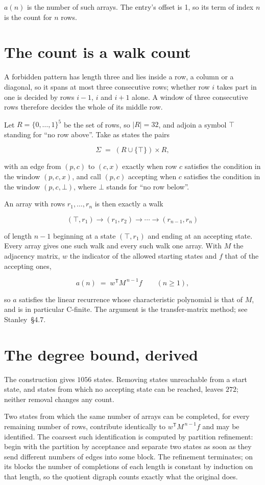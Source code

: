 \documentclass[11pt]{article}
\theoremstyle{definition}
\begin{document}
$a(n)$ is the number of such arrays. The entry's offset is 1, so its term of index $n$ is the count for $n$ rows.

\section{The count is a walk count}

A forbidden pattern has length three and lies inside a row, a column or a diagonal, so it spans at most three consecutive rows; whether row $i$ takes part in one is decided by rows $i-1$, $i$ and $i+1$ alone. A window of three consecutive rows therefore decides the whole of its middle row.

Let $R = \{0,\dots,1\}^{5}$ be the set of rows, so $|R| = 32$, and adjoin a symbol $\top$ standing for ``no row above''. Take as states the pairs

\[\Sigma \;=\; (R \cup \{\top\}) \times R,\]

with an edge from $(p,c)$ to $(c,x)$ exactly when row $c$ satisfies the condition in the window $(p,c,x)$, and call $(p,c)$ accepting when $c$ satisfies the condition in the window $(p,c,\bot)$, where $\bot$ stands for ``no row below''.

An array with rows $r_1,\dots,r_n$ is then exactly a walk

\[(\top,r_1) \to (r_1,r_2) \to \cdots \to (r_{n-1},r_n)\]

of length $n-1$ beginning at a state $(\top,r_1)$ and ending at an accepting state. Every array gives one such walk and every such walk one array. With $M$ the adjacency matrix, $w$ the indicator of the allowed starting states and $f$ that of the accepting ones,

\[a(n) \;=\; w^{\mathsf T} M^{\,n-1} f \qquad (n \ge 1),\]

so $a$ satisfies the linear recurrence whose characteristic polynomial is that of $M$, and is in particular C-finite. The argument is the transfer-matrix method; see Stanley~\S4.7.

\section{The degree bound, derived}

The construction gives $1056$ states. Removing states unreachable from a start state, and states from which no accepting state can be reached, leaves $272$; neither removal changes any count.

Two states from which the same number of arrays can be completed, for every remaining number of rows, contribute identically to $w^{\mathsf T}M^{\,n-1}f$ and may be identified. The coarsest such identification is computed by partition refinement: begin with the partition by acceptance and separate two states as soon as they send different numbers of edges into some block. The refinement terminates; on its blocks the number of completions of each length is constant by induction on that length, so the quotient digraph counts exactly what the original does.
\end{document}
